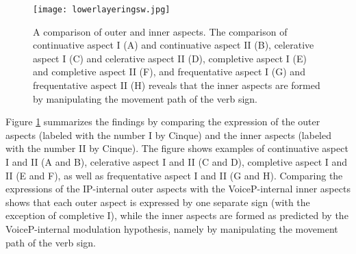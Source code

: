 \begin{figure}[bt]
\centering
	\texttt{[image: lowerlayeringsw.jpg]}
	\caption{A comparison of outer and inner aspects. The comparison of continuative aspect I (A) and continuative aspect II (B), celerative aspect I (C) and celerative aspect II (D), completive aspect I (E) and completive aspect II (F), and frequentative aspect I (G) and frequentative aspect II (H) reveals that the inner aspects are formed by manipulating the movement path of the verb sign.}
	\label{fig:lowerlayering}
\end{figure}

Figure \ref{fig:lowerlayering} summarizes the findings by comparing the expression of the outer aspects (labeled with the number I by Cinque) and the inner aspects (labeled with the number II by Cinque). The figure shows examples of continuative aspect I and II (A and B), celerative aspect I and II (C and D), completive aspect I and II (E and F), as well as frequentative aspect I and II (G and H). Comparing the expressions of the IP-internal outer aspects with the VoiceP-internal inner aspects shows that each outer aspect is expressed by one separate sign (with the exception of completive I), while the inner aspects are formed as predicted by the VoiceP-internal modulation hypothesis, namely by manipulating the movement path of the verb sign.






